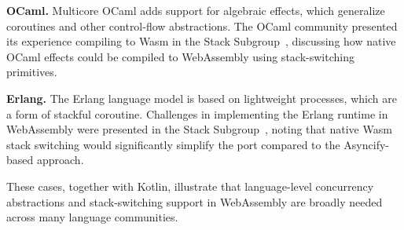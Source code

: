 \textbf{OCaml.} Multicore OCaml adds support for algebraic effects, which generalize coroutines and other
control-flow abstractions. The OCaml community presented its experience compiling to Wasm in the
Stack Subgroup~\cite{ocaml-wasm-meeting}, discussing how native OCaml effects could be compiled to
WebAssembly using stack-switching primitives.

\textbf{Erlang.} The Erlang language model is based on lightweight processes, which are a form of
stackful coroutine. Challenges in implementing the Erlang runtime in WebAssembly were presented in the
Stack Subgroup~\cite{erlang-wasm-meeting}, noting that native Wasm stack switching would significantly
simplify the port compared to the Asyncify-based approach.

These cases, together with Kotlin, illustrate that language-level concurrency abstractions and
stack-switching support in WebAssembly are broadly needed across many language communities.

